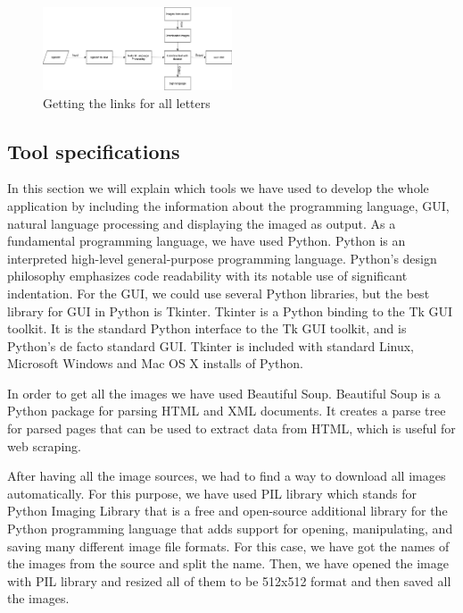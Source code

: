 \documentclass[twocolumn,10pt]{asme2ej}
\begin{document}
\begin{figure}[h]
    \centering
    \includegraphics[width=0.5\textwidth]{figure/Untitled Diagram.png}
    \caption{Getting the links for all letters}
    \label{fig:mesh1}
\end{figure}

\subsection{Tool specifications}
In this section we will explain which tools we have used to develop the whole application by including the information about the programming language, GUI, natural language processing and displaying the imaged as output.  
As a fundamental programming language, we have used Python. Python is an interpreted high-level general-purpose programming language. Python's design philosophy emphasizes code readability with its notable use of significant indentation. 
For the GUI, we could use several Python libraries, but the best library for GUI in Python is Tkinter. Tkinter is a Python binding to the Tk GUI toolkit. It is the standard Python interface to the Tk GUI toolkit, and is Python's de facto standard GUI. Tkinter is included with standard Linux, Microsoft Windows and Mac OS X installs of Python.

In order to get all the images we have used Beautiful Soup. Beautiful Soup is a Python package for parsing HTML and XML documents. It creates a parse tree for parsed pages that can be used to extract data from HTML, which is useful for web scraping. 

After having all the image sources, we had to find a way to download all images automatically. For this purpose, we have used PIL library which stands for Python Imaging Library that is a free and open-source additional library for the Python programming language that adds support for opening, manipulating, and saving many different image file formats. For this case, we have got the names of the images from the source and split the name. Then, we have opened the image with PIL library and resized all of them to be 512x512 format and then saved all the images. 
\end{document}
